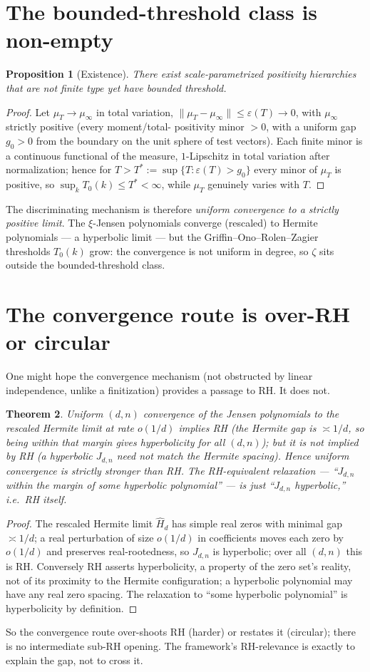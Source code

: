 \documentclass[11pt]{amsart}
\newtheorem{theorem}{Theorem}[section]
\newtheorem{proposition}[theorem]{Proposition}
\theoremstyle{definition}
\theoremstyle{remark}
\begin{document}
\section{The bounded-threshold class is non-empty}
\begin{proposition}[Existence]\label{prop:exist}
There exist scale-parametrized positivity hierarchies that are not finite type
yet have bounded threshold.
\end{proposition}
\begin{proof}
Let $\mu_T\to\mu_\infty$ in total variation, $\|\mu_T-\mu_\infty\|\le
\varepsilon(T)\to0$, with $\mu_\infty$ strictly positive (every moment/total-
positivity minor $>0$, with a uniform gap $g_0>0$ from the boundary on the unit
sphere of test vectors). Each finite minor is a continuous functional of the
measure, $1$-Lipschitz in total variation after normalization; hence for
$T>T^\ast:=\sup\{T:\varepsilon(T)>g_0\}$ every minor of $\mu_T$ is positive, so
$\sup_kT_0(k)\le T^\ast<\infty$, while $\mu_T$ genuinely varies with $T$.
\end{proof}
The discriminating mechanism is therefore \emph{uniform convergence to a strictly
positive limit}. The $\xi$-Jensen polynomials converge (rescaled) to Hermite
polynomials --- a hyperbolic limit --- but the Griffin--Ono--Rolen--Zagier
thresholds $T_0(k)$ grow: the convergence is not uniform in degree, so $\zeta$
sits outside the bounded-threshold class.

\section{The convergence route is over-RH or circular}
One might hope the convergence mechanism (not obstructed by linear independence,
unlike a finitization) provides a passage to RH. It does not.
\begin{theorem}\label{thm:overRH}
Uniform $(d,n)$ convergence of the Jensen polynomials to the rescaled Hermite
limit at rate $o(1/d)$ implies RH (the Hermite gap is $\asymp1/d$, so being
within that margin gives hyperbolicity for all $(d,n)$); but it is not implied by
RH (a hyperbolic $J_{d,n}$ need not match the Hermite spacing). Hence uniform
convergence is strictly stronger than RH. The RH-equivalent relaxation ---
``$J_{d,n}$ within the margin of \emph{some} hyperbolic polynomial'' --- is just
``$J_{d,n}$ hyperbolic,'' i.e.\ RH itself.
\end{theorem}
\begin{proof}
The rescaled Hermite limit $\widehat H_d$ has simple real zeros with minimal gap
$\asymp1/d$; a real perturbation of size $o(1/d)$ in coefficients moves each zero
by $o(1/d)$ and preserves real-rootedness, so $J_{d,n}$ is hyperbolic; over all
$(d,n)$ this is RH. Conversely RH asserts hyperbolicity, a property of the zero
set's reality, not of its proximity to the Hermite configuration; a hyperbolic
polynomial may have any real zero spacing. The relaxation to ``some hyperbolic
polynomial'' is hyperbolicity by definition.
\end{proof}
So the convergence route over-shoots RH (harder) or restates it (circular); there
is no intermediate sub-RH opening. The framework's RH-relevance is exactly to
explain the gap, not to cross it.
\end{document}

